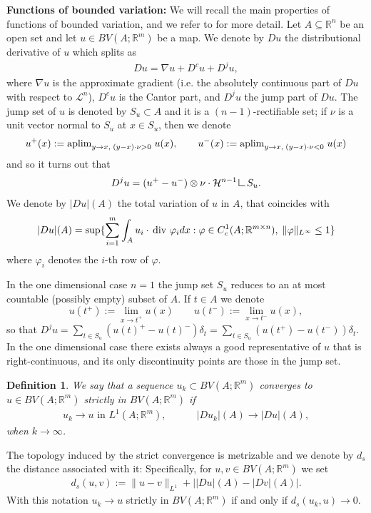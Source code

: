 \documentclass[a4paper,11pt]{article}
\numberwithin{equation}{section}
\newtheorem{definition}[theorem]{Definition}
\def\div{\,{\rm div\ }}
\newcommand{\R}{\mathbb{R}}
\newcommand{\res}      {\mathop{\hbox{\vrule height 7pt width .5pt depth
                        0pt\vrule height .5pt width 6pt depth 0pt}}\nolimits}
\begin{document}
\textbf{Functions of bounded variation:} We will recall the main properties of functions of bounded variation, and we refer to  \cite{AmFuPa:00} for more detail.
Let $A\subseteq\R^n$ be an open set and let $u\in BV(A;\R^m)$ be a map. We denote by $Du$ the distributional derivative of $u$ which splits as
\begin{align*}
Du=\nabla u+D^cu+D^ju,
\end{align*}  
where $\nabla u$ is the approximate gradient (i.e. the absolutely continuous part of $Du$ with respect to $\mathcal L^n$), $D^cu$ is the Cantor part, and $D^ju$ the jump part of $Du$. The jump set of $u$ is denoted by $S_u\subset A$ and it is a ${(n-1)}$-rectifiable set; 
if $\nu$ is a unit vector normal to $S_u$ at $x\in S_u$, then we denote 
$$u^+(x):=\text{{\rm aplim}}_{y\rightarrow x,\;(y-x)\cdot \nu>0}\;u(x),\qquad u^-(x):=\text{{\rm aplim}}_{y\rightarrow x,\;(y-x)\cdot \nu<0}\;u(x)$$
and so it turns out that 
\begin{align*}
D^ju=(u^+-u^-)\otimes \nu \cdot \mathcal H^{n-1}\res S_u.
\end{align*}
We denote by $|Du|(A)$ the total variation of $u$ in $A$, that coincides with 
\begin{align}
|Du|(A)=\sup\{\sum_{i=1}^m\int_A u_i \cdot \div\varphi_i dx: \varphi\in C^1_c(A;\R^{m\times n}),\;\|\varphi\|_{L^\infty}\leq 1\}
\end{align}
where $\varphi_i$ denotes the $i$-th row of $\varphi$.


In the one dimensional case $n=1$ the jump set $S_u$ reduces to an at most countable (possibly empty) subset  of $A$. If $t\in A$ we denote 
$$u(t^+):=\lim_{x\rightarrow t^+}u(x)\qquad u(t^-):=\lim_{x\rightarrow t^-}u(x),$$
so that $D^ju=\sum_{t\in S_u}(u(t)^+-u(t)^-)\delta_t=\sum_{t\in S_u}(u(t^+)-u(t^-))\delta_t$. In the one dimensional case there exists always a good representative of $u$ that is right-continuous, and its only discontinuity points are those in the jump set.

\begin{definition}
We say that a sequence  $u_k\subset BV(A;\R^m)$ converges to $u\in BV(A;\R^m)$ strictly in  $BV(A;\R^m)$ if 
\begin{align*}
u_k\rightarrow u \text{ in }L^1(A;\R^m),\qquad \quad |Du_k|(A)\rightarrow |Du|(A),
\end{align*}
when $k\rightarrow\infty$. 
\end{definition}
The topology induced by the strict convergence is metrizable and we denote by $d_s$ the distance associated with it: Specifically, for $u,v\in BV(A;\R^m)$ we set
\begin{align}\label{strictdistance}
d_s(u,v):=\|u-v\|_{L^1}+\big||Du|(A)-|Dv|(A)\big|.
\end{align}
With this notation $u_k\rightarrow u$ strictly in $BV(A;\R^m)$ if and only if $d_s(u_k,u)\rightarrow 0$.
\end{document}
